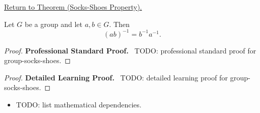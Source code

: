 \newpage
{}
\label{prf:group-socks-shoes}

\begin{remark*}[Return]
\hyperref[prop:group-socks-shoes]{Return to Theorem (Socks-Shoes Property).}
\end{remark*}

\begin{theorem*}
Let $G$ be a group and let $a, b \in G$. Then
\[
(ab)^{-1} = b^{-1} a^{-1}.
\]
\end{theorem*}

\begin{proof}
\textbf{Professional Standard Proof.}~
TODO: professional standard proof for group-socks-shoes.
\end{proof}

\begin{proof}
\textbf{Detailed Learning Proof.}~
TODO: detailed learning proof for group-socks-shoes.
\end{proof}

\begin{remark*}
\end{remark*}

\begin{dependencies}
\begin{itemize}
  \item TODO: list mathematical dependencies.
\end{itemize}
\end{dependencies}

\clearpage
